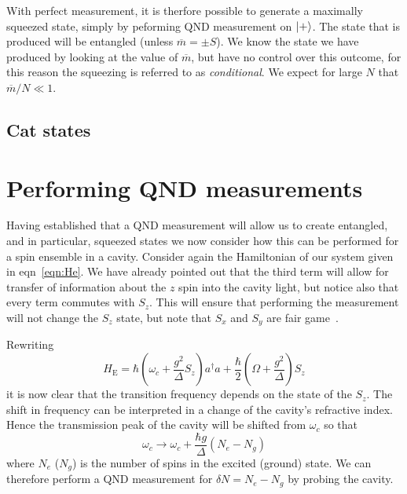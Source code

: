 \documentclass{article}
\newcommand*\meas[1]{\overline{#1}}
\begin{document}
With perfect measurement, it is therfore possible to generate a maximally
squeezed state, simply by peforming QND measurement on  $\ket{+}$. The state
that is produced will be entangled (unless $\meas{m} = \pm S$). We know the
state we have produced by looking at the value of $\meas{m}$, but have no
control over this outcome, for this reason the squeezing is referred to as
\emph{conditional}.
%
We expect for large $N$ that $\meas{m}/N \ll 1$.


\subsection{Cat states}


\section{Performing QND measurements}

Having established that a QND measurement will allow us to create entangled,
and in particular, squeezed states we now consider how this can be performed
for a spin ensemble in a cavity. Consider again the Hamiltonian of our system
given in eqn~\ref{eqn:He}. We have already pointed out that the
third term will allow for transfer of information about the $z$ spin into the
cavity light, but notice also that every term commutes with $S_z$. This will
ensure that performing the measurement will not change the $S_z$ state, but
note that $S_x$ and $S_y$ are fair game~\cite{SchleierSmith2011}.

Rewriting
%
\begin{equation}
  H_\text{E}= 
    \hbar \left(\omega_c + \frac{g^2}{\Delta}S_z\right)a^\dagger a + 
    \frac{\hbar}{2}\left(\Omega + \frac{g^2}{\Delta}\right)S_z
\end{equation}
%
it is now clear that the transition frequency depends on the state of the
$S_z$. The shift in frequency can be interpreted in a change of the cavity's
refractive index. Hence the transmission peak of the cavity will be shifted
from $\omega_c$ so that
%
\begin{equation}
  \omega_c \rightarrow \omega_c + \frac{\hbar g}{\Delta}(N_e - N_g)
\end{equation}
%
where $N_e$ ($N_g$) is the number of spins in the excited (ground) state. We
can therefore perform a QND measurement for $\delta N = N_e - N_g$ by probing
the cavity.
\end{document}

